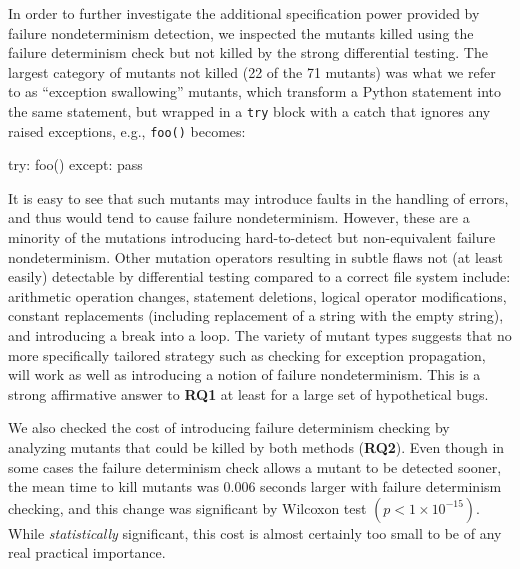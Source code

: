 In order to further investigate the additional specification power
provided by failure nondeterminism detection, we inspected the mutants
killed using the failure determinism check but not killed by the
strong differential testing.  The largest category of mutants not
killed (22 of the 71 mutants) was what we refer to as ``exception
swallowing'' mutants, which transform a Python statement into the same
statement, but wrapped in a {\tt try} block with a catch that ignores
any raised exceptions, e.g., {\tt foo()} becomes:

\begin{code}
try: foo()
except: pass
\end{code}

\noindent It is easy to
see that such mutants may introduce faults in the handling of
errors, and thus would tend to cause failure nondeterminism.  However,
these are a minority of the mutations introducing hard-to-detect but
non-equivalent failure
nondeterminism.  Other mutation operators resulting in subtle flaws
not (at least easily) detectable by differential testing compared to a
correct file system include:  arithmetic operation changes, statement
deletions, logical operator modifications, constant replacements
(including replacement of a string with the empty string), and
introducing a break into a loop.  The variety of mutant types suggests
that no more specifically tailored strategy such as checking for
exception propagation, will work as well as introducing a notion of
failure nondeterminism.  This is a strong affirmative answer to {\bf
  RQ1} at least for a large set of hypothetical bugs.

We also checked the cost of introducing failure determinism checking
by analyzing mutants that could be killed by both methods ({\bf RQ2}).  Even
though in some cases the failure determinism check allows a mutant to
be detected sooner, the mean time to kill mutants was 0.006 seconds
larger with failure determinism checking, and this change was significant by Wilcoxon test
$(p < 1 \times 10^{-15})$.  While \emph{statistically} significant,
this cost is almost certainly
too small to be of any real practical importance.

